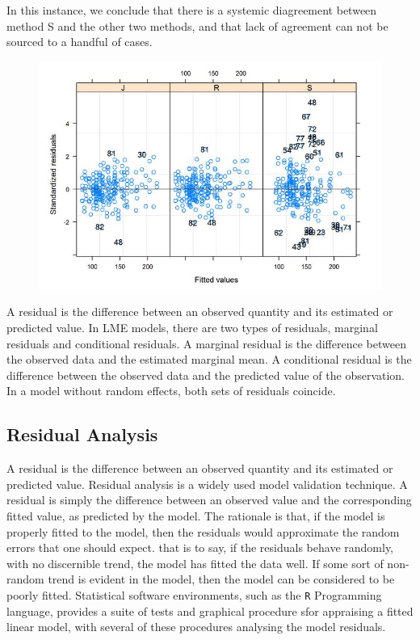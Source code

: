 \documentclass[12pt, a4paper]{report}
\theoremstyle{plain}
\theoremstyle{definition}
\theoremstyle{remark}
\begin{document}
In this instance, we conclude that there is a systemic diagreement between method S and the other two methods, and that lack of agreement can not be sourced to a handful of cases.
\begin{figure}[h!]
	\centering
	\includegraphics[width=0.7\linewidth]{images/bloodnlmeResidPlot2B}
\end{figure}


\newpage

A residual is the difference between an observed quantity and its
estimated or predicted value. In LME models, there are two types
of residuals, marginal residuals and conditional residuals. A
marginal residual is the difference between the observed data and
the estimated marginal mean. A conditional residual is the
difference between the observed data and the predicted value of
the observation. In a model without random effects, both sets of
residuals coincide.



\subsection{Residual Analysis}
A residual is the difference between an observed quantity and its
estimated or predicted value. 
Residual analysis is a widely used model validation technique. A residual is simply the difference between an observed value and the corresponding fitted value, as predicted by the model. The rationale is that, if the model is properly fitted to the model, then the residuals would approximate the random errors that one should expect.
that is to say, if the residuals behave randomly, with no discernible trend, the model has fitted the data well. If some sort of non-random trend is evident in the model, then the model can be considered to be poorly fitted.
Statistical software environments, such as the \texttt{R} Programming language, provides a suite of tests and graphical procedure sfor appraising a fitted linear model, with several 
of these procedures analysing the model residuals.
\end{document}
